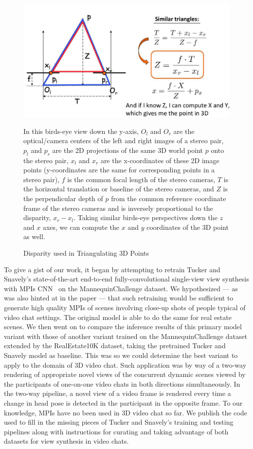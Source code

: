 \begin{figure}[!h]
    \includegraphics[width=1\columnwidth]{figures/disparity-triangulation.png}
    \caption{Disparity used in Triangulating 3D Points~\cite{fidler_depth_2021}}
    \label{fig:disparity-triangulation}
    {\small In this birds-eye view down the y-axis, $O_l$ and $O_r$ are the optical/camera centers of the left and right images of a stereo pair, $p_l$ and $p_r$ are the 2D projections of the same 3D world point $p$ onto the stereo pair, $x_l$ and $x_r$ are the x-coordinates of these 2D image points (y-coordinates are the same for corresponding points in a stereo pair), $f$ is the common focal length of the stereo cameras, $T$ is the horizontal translation or baseline of the stereo cameras, and $Z$ is the perpendicular depth of $p$ from the common reference coordinate frame of the stereo cameras and is inversely proportional to the disparity, $x_r - x_l$. Taking similar birds-eye perspectives down the $z$ and $x$ axes, we can compute the $x$ and $y$ coordinates of the 3D point as well.}
\end{figure}

To give a gist of our work, it began by attempting to retrain Tucker and Snavely's state-of-the-art end-to-end fully-convolutional single-view view synthesis with MPIs CNN~\cite{single_view_mpi} on the MannequinChallenge dataset. We hypothesized --- as was also hinted at in the paper --- that such retraining would be sufficient to generate high quality MPIs of scenes involving close-up shots of people typical of video chat settings. The original model is able to do the same for real estate scenes. We then went on to compare the inference results of this primary model variant with those of another variant trained on the MannequinChallenge dataset extended by the RealEstate10K dataset, taking the pretrained Tucker and Snavely model as baseline. This was so we could determine the best variant to apply to the domain of 3D video chat. Such application was by way of a two-way rendering of appropriate novel views of the concurrent dynamic scenes viewed by the participants of one-on-one video chats in both directions simultaneously. In the two-way pipeline, a novel view of a video frame is rendered every time a change in head pose is detected in the participant in the opposite frame. To our knowledge, MPIs have no been used in 3D video chat so far. We publish the code used to fill in the missing pieces of Tucker and Snavely's training and testing pipelines along with instructions for curating and taking advantage of both datasets for view synthesis in video chats.
